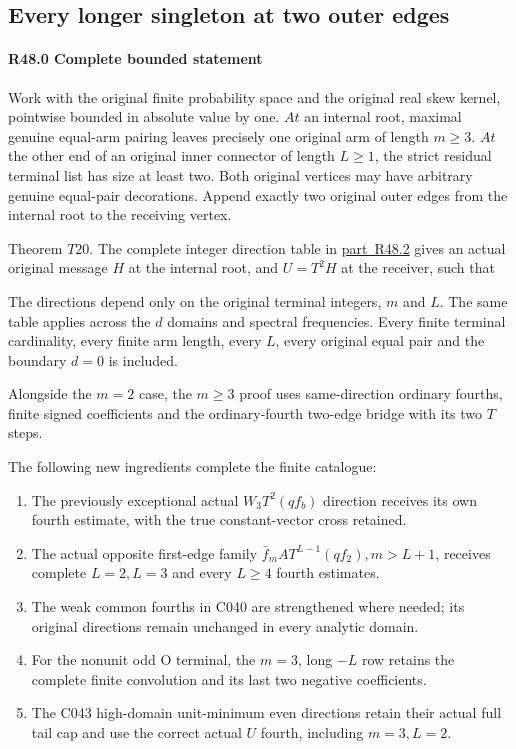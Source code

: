 \subsection{Every longer singleton at two outer edges}\label{proof:R2-C048}

\paragraph{R48.0 Complete bounded statement}

Work with the original finite probability space and the original real skew kernel, pointwise bounded in absolute value by one. \(At\) an internal root, maximal genuine equal-arm pairing leaves precisely one original arm of length \(m \ge  3\). \(At\) the other end of an original inner connector of length \(L \ge  1\), the strict residual terminal list has size at least two. Both original vertices may have arbitrary genuine equal-pair decorations. Append exactly two original outer edges from the internal root to the receiving vertex.

Theorem \(T20\). The complete integer direction table in \mbox{\hyperref[part:R48.2]{part R48.2}} gives an actual original message \(H\) at the internal root, and \(U = T^2 H\) at the receiver, such that


The directions depend only on the original terminal integers, \(m\) and \(L\). The same table applies across the \(d\) domains and spectral frequencies. Every finite terminal cardinality, every finite arm length, every \(L\), every original equal pair and the boundary \(d = 0\) is included.

Alongside the \(m = 2\) case, the \(m \ge  3\) proof uses same-direction ordinary fourths, finite signed coefficients and the ordinary-fourth two-edge bridge with its two \(T\) steps.

The following new ingredients complete the finite catalogue:

\begin{enumerate}
\item The previously exceptional actual \(W_{3} T^2(q f_b)\) direction receives its own fourth estimate, with the true constant-vector cross retained.
\item The actual opposite first-edge family \(\bar f_m A T^{L-1}(q f_{2}),\allowbreak \allowbreak  m > L+1\), receives complete \(L = 2,\allowbreak \allowbreak  L = 3\) and every \(L \ge  4\) fourth estimates.
\item The weak common fourths in C040 are strengthened where needed; its original directions remain unchanged in every analytic domain.
\item For the nonunit odd O terminal, the \(m = 3\), long \(-L\) row retains the complete finite convolution and its last two negative coefficients.
\item The C043 high-domain unit-minimum even directions retain their actual full tail cap and use the correct actual \(U\) fourth, including \(m=3,\allowbreak \allowbreak L=2\).
\end{enumerate}


